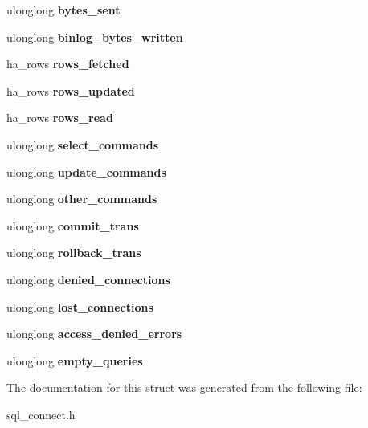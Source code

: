 \begin{DoxyCompactItemize}
ulonglong {\bfseries bytes\+\_\+sent}
\item 
\mbox{\label{structst__thread__stats_a7ed12d9138e249073531c4f7ae9f34ca}} 
ulonglong {\bfseries binlog\+\_\+bytes\+\_\+written}
\item 
\mbox{\label{structst__thread__stats_a0fb7e67bd086025f5c80ad60bbdbebcb}} 
ha\+\_\+rows {\bfseries rows\+\_\+fetched}
\item 
\mbox{\label{structst__thread__stats_a69a04ff3a934b8afd139c0b4afbbd3ca}} 
ha\+\_\+rows {\bfseries rows\+\_\+updated}
\item 
\mbox{\label{structst__thread__stats_a87ed2a5eac65569b825a175d06906995}} 
ha\+\_\+rows {\bfseries rows\+\_\+read}
\item 
\mbox{\label{structst__thread__stats_a51520e77345882e9be42991f29d535e0}} 
ulonglong {\bfseries select\+\_\+commands}
\item 
\mbox{\label{structst__thread__stats_a70bed7db176ce37747fe3d88bd83254e}} 
ulonglong {\bfseries update\+\_\+commands}
\item 
\mbox{\label{structst__thread__stats_a9ad0a9abcb4343fe9197fed8ab25a92f}} 
ulonglong {\bfseries other\+\_\+commands}
\item 
\mbox{\label{structst__thread__stats_a51cd78f331fc12b60435039a24c4e1af}} 
ulonglong {\bfseries commit\+\_\+trans}
\item 
\mbox{\label{structst__thread__stats_a75b582170a5c4ad22dc840df5a17fa5a}} 
ulonglong {\bfseries rollback\+\_\+trans}
\item 
\mbox{\label{structst__thread__stats_ad3f75e5ab933442d88902ff8f33d6d58}} 
ulonglong {\bfseries denied\+\_\+connections}
\item 
\mbox{\label{structst__thread__stats_a5677844adc8ade55acce2b2419efed85}} 
ulonglong {\bfseries lost\+\_\+connections}
\item 
\mbox{\label{structst__thread__stats_aae1cc8792c1b73a3bfc42e55262b61ad}} 
ulonglong {\bfseries access\+\_\+denied\+\_\+errors}
\item 
\mbox{\label{structst__thread__stats_ad138593b1b4f5cdbf9224f1ee4691493}} 
ulonglong {\bfseries empty\+\_\+queries}
\end{DoxyCompactItemize}


The documentation for this struct was generated from the following file\+:\begin{DoxyCompactItemize}
\item 
sql\+\_\+connect.\+h\end{DoxyCompactItemize}
